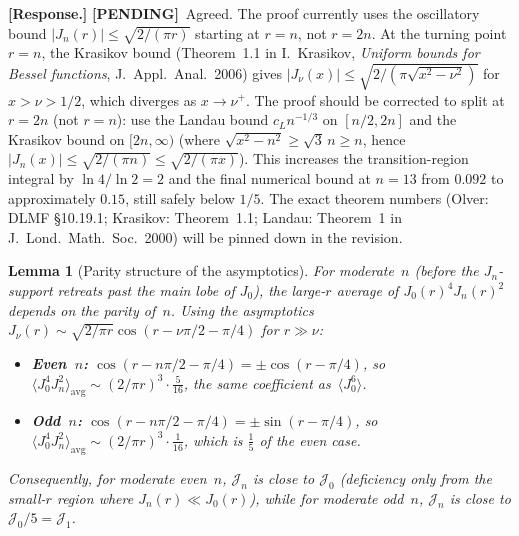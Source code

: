 \documentclass[12pt]{article}
\newtheorem{lemma}[theorem]{Lemma}
\theoremstyle{definition}
\theoremstyle{remark}
\newcommand{\response}[1]{\par\noindent\textbf{\color{blue}[Response.]} {\color{blue}#1}\par\smallskip}
\newcommand{\pending}{\textbf{\color{orange}[PENDING]}}
\begin{document}
\response{\pending\ Agreed.  The proof currently uses the oscillatory
bound $|J_n(r)|\leq\sqrt{2/(\pi r)}$ starting at $r=n$, not $r=2n$.
At the turning point $r=n$, the Krasikov bound (Theorem~1.1 in
I.~Krasikov, \emph{Uniform bounds for Bessel functions},
J.~Appl.\ Anal.\ 2006) gives
$|J_\nu(x)|\leq\sqrt{2/(\pi\sqrt{x^2-\nu^2})}$ for $x>\nu>1/2$, which
diverges as $x\to\nu^+$.  The proof should be corrected to split at
$r=2n$ (not $r=n$): use the Landau bound $c_L n^{-1/3}$ on $[n/2,2n]$
and the Krasikov bound on $[2n,\infty)$ (where
$\sqrt{x^2-n^2}\geq\sqrt{3}\,n\geq n$, hence
$|J_n(x)|\leq\sqrt{2/(\pi n)}\leq\sqrt{2/(\pi x)}$).  This increases
the transition-region integral by $\ln 4/\ln 2=2$ and the final
numerical bound at $n=13$ from $0.092$ to approximately $0.15$, still
safely below $1/5$.  The exact theorem numbers (Olver: DLMF \S10.19.1;
Krasikov: Theorem~1.1; Landau: Theorem~1 in J.~Lond.\ Math.\ Soc.\
2000) will be pinned down in the revision.}

\begin{lemma}[Parity structure of the asymptotics]
  \label{lem:parity}
  For moderate~$n$ (before the $J_n$-support retreats past the main
  lobe of $J_0$), the large-$r$ average of $J_0(r)^4J_n(r)^2$ depends
  on the parity of~$n$.  Using the asymptotics
  $J_\nu(r)\sim\sqrt{2/\pi r}\cos(r-\nu\pi/2-\pi/4)$ for $r\gg\nu$:
  \begin{itemize}
    \item \textbf{Even~$n$:}
      $\cos(r-n\pi/2-\pi/4)=\pm\cos(r-\pi/4)$, so
      $\langle J_0^4J_n^2\rangle_{\mathrm{avg}}
      \sim(2/\pi r)^3\cdot\tfrac{5}{16}$,
      the same coefficient as~$\langle J_0^6\rangle$.
    \item \textbf{Odd~$n$:}
      $\cos(r-n\pi/2-\pi/4)=\pm\sin(r-\pi/4)$, so
      $\langle J_0^4J_n^2\rangle_{\mathrm{avg}}
      \sim(2/\pi r)^3\cdot\tfrac{1}{16}$,
      which is $\tfrac{1}{5}$ of the even case.
  \end{itemize}
  Consequently, for moderate even~$n$, $\mathcal J_n$ is close to
  $\mathcal J_0$ (deficiency only from the small-$r$ region where
  $J_n(r)\ll J_0(r)$), while for moderate odd~$n$, $\mathcal J_n$ is
  close to $\mathcal J_0/5=\mathcal J_1$.
\end{lemma}
\end{document}
